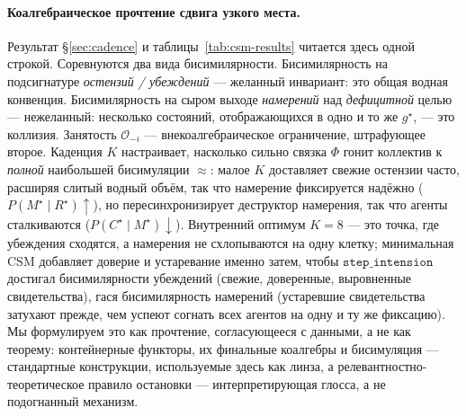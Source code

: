 \documentclass{article}
\newcommand{\method}[1]{\texttt{#1}}
\begin{document}
\paragraph{Коалгебраическое прочтение сдвига узкого места.}
Результат \S\ref{sec:cadence} и таблицы~\ref{tab:csm-results} читается
здесь одной строкой. Соревнуются два вида бисимилярности.
Бисимилярность на подсигнатуре \emph{остензий / убеждений} --- желанный
инвариант: это общая водная конвенция. Бисимилярность на сыром выходе
\emph{намерений} над \emph{дефицитной} целью --- нежеланный: несколько
состояний, отображающихся в одно и то же $g^{\star}$, --- это коллизия.
Занятость $\mathcal{O}_{-i}$ --- внекоалгебраическое ограничение,
штрафующее второе. Каденция $K$ настраивает, насколько сильно связка
$\Phi$ гонит коллектив к \emph{полной} наибольшей бисимуляции
$\approx$: малое $K$ доставляет свежие остензии часто, расширяя слитый
водный объём, так что намерение фиксируется надёжно
($P(M^\star\mid R^\star)\uparrow$), но пересинхронизирует деструктор
намерения, так что агенты сталкиваются
($P(C^\star\mid M^\star)\downarrow$). Внутренний оптимум $K{=}8$ ---
это точка, где убеждения сходятся, а намерения не схлопываются на одну
клетку; минимальная CSM добавляет доверие и устаревание именно затем,
чтобы $\method{step\_intension}$ достигал бисимилярности убеждений
(свежие, доверенные, выровненные свидетельства), гася бисимилярность
намерений (устаревшие свидетельства затухают прежде, чем успеют согнать
всех агентов на одну и ту же фиксацию). Мы формулируем это как
прочтение, согласующееся с данными, а не как теорему: контейнерные
функторы, их финальные коалгебры и бисимуляция --- стандартные
конструкции, используемые здесь как линза, а
релевантностно-теоретическое правило остановки --- интерпретирующая
глосса, а не подогнанный механизм.
\end{document}
